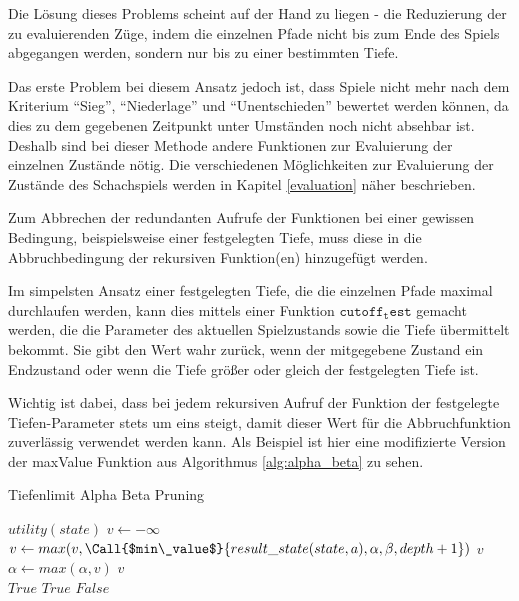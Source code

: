 
Die Lösung dieses Problems scheint auf der Hand zu liegen - die Reduzierung der zu evaluierenden Züge, indem die einzelnen Pfade nicht bis zum Ende des Spiels abgegangen werden, sondern nur bis zu einer bestimmten Tiefe.

Das erste Problem bei diesem Ansatz jedoch ist, dass Spiele nicht mehr nach dem Kriterium ``Sieg'', ``Niederlage'' und ``Unentschieden'' bewertet werden können, da dies zu dem gegebenen Zeitpunkt unter Umständen noch nicht absehbar ist. Deshalb sind bei dieser Methode andere Funktionen zur Evaluierung der einzelnen Zustände nötig. Die verschiedenen Möglichkeiten zur Evaluierung der Zustände des Schachspiels werden in Kapitel \ref{evaluation} näher beschrieben.

Zum Abbrechen der redundanten Aufrufe der Funktionen bei einer gewissen Bedingung, beispielsweise einer festgelegten Tiefe, muss diese in die Abbruchbedingung der rekursiven Funktion(en) hinzugefügt werden. 

Im simpelsten Ansatz einer festgelegten Tiefe, die die einzelnen Pfade maximal durchlaufen werden, kann dies mittels einer Funktion $\mathtt{cutoff_test}$ gemacht werden, die die Parameter des aktuellen Spielzustands sowie die Tiefe übermittelt bekommt. Sie gibt den Wert wahr zurück, wenn der mitgegebene Zustand ein Endzustand oder wenn die Tiefe größer oder gleich der festgelegten Tiefe ist. \cite{Russell2010}

Wichtig ist dabei, dass bei jedem rekursiven Aufruf der Funktion der festgelegte Tiefen-Parameter stets um eins steigt, damit dieser Wert für die Abbruchfunktion zuverlässig verwendet werden kann. Als Beispiel ist hier eine modifizierte Version der maxValue Funktion aus Algorithmus \ref{alg:alpha_beta} zu sehen.

\begin{algorithm}[h]
\caption{Tiefenlimit Alpha Beta Pruning \cite{Russell2010}}
\label{alg:depth_limit}
\begin{algorithmic}
 \State \Return $utility(state)$ \EndIf
\State $v \gets -\infty$
\State $v \gets max(v, \Call{$min\_value$}{result\_state(state, a), \alpha, \beta, depth + 1})$
 \State \Return $v$ \EndIf
\State $\alpha \gets max(\alpha, v)$
\EndFor
\State \Return $v$
\EndFunction
\\
 \State \Return $True$ \EndIf
{} \State \Return $True$ \EndIf
\State \Return $False$
\EndFunction 
\end{algorithmic}
\end{algorithm}

